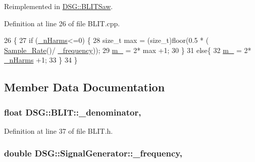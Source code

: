 Reimplemented in \hyperlink{classDSG_1_1BLITSaw_ae0f3f38ca9ae61f9a377f7ca141995b3}{D\+S\+G\+::\+B\+L\+I\+T\+Saw}.



Definition at line 26 of file B\+L\+I\+T.\+cpp.


\begin{DoxyCode}
26                          \{
27     \textcolor{keywordflow}{if} (\hyperlink{classDSG_1_1BLIT_afe749d26f1503740bedd54f5147bc66d}{\_nHarms}<=0) \{
28         \textcolor{keywordtype}{size\_t} max = (size\_t)floor(0.5 * ( \hyperlink{namespaceDSG_a0c5c3a251b3688398da18138c5efe4bf}{Sample\_Rate}()/ \hyperlink{classDSG_1_1SignalGenerator_a67e296e3506dcdf09402c667cddff9ac}{\_frequency}));
29         \hyperlink{classDSG_1_1BLIT_a93504a847d83314bbd9020750820242b}{m\_} = 2* max +1;
30     \}
31     \textcolor{keywordflow}{else}\{
32         \hyperlink{classDSG_1_1BLIT_a93504a847d83314bbd9020750820242b}{m\_} = 2* \hyperlink{classDSG_1_1BLIT_afe749d26f1503740bedd54f5147bc66d}{\_nHarms} +1;
33     \}
34 \}\end{DoxyCode}


\subsection{Member Data Documentation}
\hypertarget{classDSG_1_1BLIT_a664b4f06a7b5657261cfaa30dd503c16}{
\subsubsection[{\+\_\+denominator}]{\setlength{\rightskip}{0pt plus 5cm}float D\+S\+G\+::\+B\+L\+I\+T\+::\+\_\+denominator\hspace{0.3cm}{\ttfamily [protected]}, {\ttfamily [inherited]}}}\label{classDSG_1_1BLIT_a664b4f06a7b5657261cfaa30dd503c16}


Definition at line 37 of file B\+L\+I\+T.\+h.

\hypertarget{classDSG_1_1SignalGenerator_a67e296e3506dcdf09402c667cddff9ac}{
\subsubsection[{\+\_\+frequency}]{\setlength{\rightskip}{0pt plus 5cm}double D\+S\+G\+::\+Signal\+Generator\+::\+\_\+frequency\hspace{0.3cm}{\ttfamily [protected]}, {\ttfamily [inherited]}}}\label{classDSG_1_1SignalGenerator_a67e296e3506dcdf09402c667cddff9ac}


